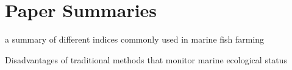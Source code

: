 \chapter{Paper Summaries}




a summary of different indices commonly used in marine fish farming \cite{BORJA2009231}

Disadvantages of traditional methods that monitor marine ecological status \cite{goodwin_traditional_env_monitoring}



